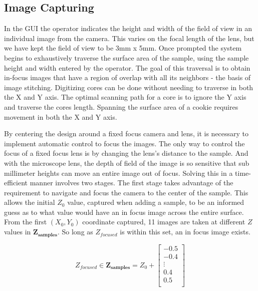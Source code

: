 \documentclass[a4paper,12pt]{article}
\begin{document}
\subsection{Image Capturing} %
In the GUI the operator indicates the height and width of the field of view in an individual image from the camera. 
This varies on the focal length of the lens, but we have kept the field of view to be 3mm x 5mm. 
Once prompted the system begins to exhaustively traverse the surface area of the sample, using the sample height and width entered by the operator.  
The goal of this traversal is to obtain in-focus images that have a region of overlap with all its neighbors - the basis of image stitching. 
Digitizing cores can be done without needing to traverse in both the X and Y axis. 
The optimal scanning path for a core is to ignore the Y axis and traverse the cores length.
Spanning the surface area of a cookie requires movement in both the X and Y axis.

By centering the design around a fixed focus camera and lens, it is necessary to implement automatic control to focus the images. 
The only way to control the focus of a fixed focus lens is by changing the lens's distance to the sample. 
And with the microscope lens, the depth of field of the image is so sensitive that sub millimeter heights can move an entire image out of focus.
Solving this in a time-efficient manner involves two stages. 
The first stage takes advantage of the requirement to navigate and focus the camera to the center of the sample.
This allows the initial $Z_0$ value, captured when adding a sample, to be an informed guess as to what value would have an in focus image across the entire surface. 
From the first $(X_0, Y_0)$ coordinate captured, 11 images are taken at different $Z$ values in $\boldsymbol{Z_{\text{samples}}}$. 
So long as $Z_{focused}$ is within this set, an in focus image exists. %

\[
Z_{focused} \in
\boldsymbol{Z_{\text{samples}}} = 
Z_0 + 
\begin{bmatrix}
-0.5 \\
-0.4 \\
\vdots \\
0.4 \\
0.5 \\
\end{bmatrix}
\] %
\end{document}
